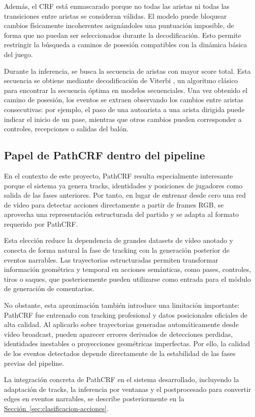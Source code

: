 Además, el CRF está enmascarado porque no todas las aristas ni todas las transiciones entre aristas se consideran válidas. El modelo puede bloquear cambios físicamente incoherentes asignándoles una puntuación imposible, de forma que no puedan ser seleccionados durante la decodificación. Esto permite restringir la búsqueda a caminos de posesión compatibles con la dinámica básica del juego.

Durante la inferencia, se busca la secuencia de aristas con mayor score total. Esta secuencia se obtiene mediante decodificación de Viterbi \citep{Viterbi1967}, un algoritmo clásico para encontrar la secuencia óptima en modelos secuenciales. Una vez obtenido el camino de posesión, los eventos se extraen observando los cambios entre aristas consecutivas: por ejemplo, el paso de una autoarista a una arista dirigida puede indicar el inicio de un pase, mientras que otros cambios pueden corresponder a controles, recepciones o salidas del balón.

\subsection{Papel de PathCRF dentro del pipeline}

En el contexto de este proyecto, PathCRF resulta especialmente interesante porque el sistema ya genera tracks, identidades y posiciones de jugadores como salida de las fases anteriores. Por tanto, en lugar de entrenar desde cero una red de vídeo para detectar acciones directamente a partir de frames RGB, se aprovecha una representación estructurada del partido y se adapta al formato requerido por PathCRF.

Esta elección reduce la dependencia de grandes datasets de vídeo anotado y conecta de forma natural la fase de tracking con la generación posterior de eventos narrables. Las trayectorias estructuradas permiten transformar información geométrica y temporal en acciones semánticas, como pases, controles, tiros o saques, que posteriormente pueden utilizarse como entrada para el módulo de generación de comentarios.

No obstante, esta aproximación también introduce una limitación importante: PathCRF fue entrenado con tracking profesional y datos posicionales oficiales de alta calidad. Al aplicarlo sobre trayectorias generadas automáticamente desde vídeo broadcast, pueden aparecer errores derivados de detecciones perdidas, identidades inestables o proyecciones geométricas imperfectas. Por ello, la calidad de los eventos detectados depende directamente de la estabilidad de las fases previas del pipeline.

La integración concreta de PathCRF en el sistema desarrollado, incluyendo la adaptación de tracks, la inferencia por ventanas y el postprocesado para convertir edges en eventos narrables, se describe posteriormente en la \hyperref[sec:clasificacion-acciones]{Sección~\ref*{sec:clasificacion-acciones}}.
 